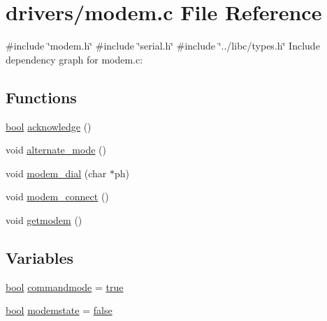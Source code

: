 \hypertarget{a00038}{}\section{drivers/modem.c File Reference}
\label{a00038}
{\ttfamily \#include \char`\"{}modem.\+h\char`\"{}}\newline
{\ttfamily \#include \char`\"{}serial.\+h\char`\"{}}\newline
{\ttfamily \#include \char`\"{}../libc/types.\+h\char`\"{}}\newline
Include dependency graph for modem.\+c\+:
\subsection*{Functions}
\begin{DoxyCompactItemize}
\item 
\hyperlink{a00134_af6a258d8f3ee5206d682d799316314b1_af6a258d8f3ee5206d682d799316314b1}{bool} \hyperlink{a00038_a8529dba543149138317e327931bf5a5c_a8529dba543149138317e327931bf5a5c}{acknowledge} ()
\item 
void \hyperlink{a00038_ace378eaa88c0b7f0cdafe97d064e36fb_ace378eaa88c0b7f0cdafe97d064e36fb}{alternate\+\_\+mode} ()
\item 
void \hyperlink{a00038_ab1123a026be8f7d0ece72e2813222da0_ab1123a026be8f7d0ece72e2813222da0}{modem\+\_\+dial} (char $\ast$ph)
\item 
void \hyperlink{a00038_a283a7e4b715971478687b2d7547780cb_a283a7e4b715971478687b2d7547780cb}{modem\+\_\+connect} ()
\item 
void \hyperlink{a00038_a5e56e19ccc8f36690d515dd09948db10_a5e56e19ccc8f36690d515dd09948db10}{getmodem} ()
\end{DoxyCompactItemize}
\subsection*{Variables}
\begin{DoxyCompactItemize}
\item 
\hyperlink{a00134_af6a258d8f3ee5206d682d799316314b1_af6a258d8f3ee5206d682d799316314b1}{bool} \hyperlink{a00038_aaf612f2f6c2c9931ab63296b3514a037_aaf612f2f6c2c9931ab63296b3514a037}{commandmode} = \hyperlink{a00134_af6a258d8f3ee5206d682d799316314b1_af6a258d8f3ee5206d682d799316314b1a08f175a5505a10b9ed657defeb050e4b}{true}
\item 
\hyperlink{a00134_af6a258d8f3ee5206d682d799316314b1_af6a258d8f3ee5206d682d799316314b1}{bool} \hyperlink{a00038_a0105e5654e7f0fa503f2853c88a2f782_a0105e5654e7f0fa503f2853c88a2f782}{modemstate} = \hyperlink{a00134_af6a258d8f3ee5206d682d799316314b1_af6a258d8f3ee5206d682d799316314b1ae9de385ef6fe9bf3360d1038396b884c}{false}
\end{DoxyCompactItemize}


